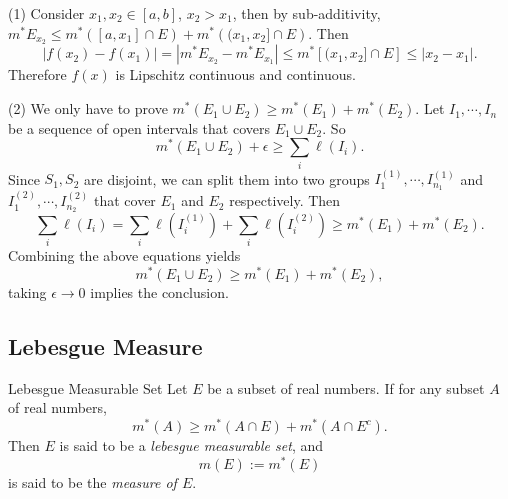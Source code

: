 \begin{solution}
  (1) Consider $x_1, x_2 \in [a, b]$, $x_2 > x_1$, then by sub-additivity,
  $m^{\ast}E_{x_2} \leq m^{\ast}\left( [a, x_1] \cap E \right) + m^{\ast} \left( (x_1, x_2] \cap E \right)$.
  Then
  \begin{equation}
    |f(x_2) - f(x_1)| = |m^{\ast}E_{x_2} - m^{\ast}E_{x_1}|
    \leq m^{\ast} \left[ (x_1, x_2] \cap E \right] \leq |x_2-x_1|.
  \end{equation}
  Therefore $f(x)$ is Lipschitz continuous and continuous.

  (2) We only have to prove $m^{\ast}(E_1 \cup E_2) \geq m^{\ast}(E_1) + m^{\ast}(E_2)$.
  Let $I_1,\cdots,I_n$ be a sequence of open intervals that covers $E_1 \cup E_2$.
  So
  \begin{equation}
    m^{\ast}(E_1 \cup E_2) + \epsilon \geq \sum_i \ell(I_i).
  \end{equation}
  Since $S_1, S_2$ are disjoint,
  we can split them into two groups $I_1^{(1)},\cdots,I_{n_1}^{(1)}$ and $I_1^{(2)},\cdots,I_{n_2}^{(2)}$
  that cover $E_1$ and $E_2$ respectively. Then
  \begin{equation}
    \sum_i \ell(I_i) = \sum_i \ell(I_i^{(1)}) + \sum_i \ell(I_i^{(2)})
    \geq m^{\ast}(E_1) + m^{\ast}(E_2).
  \end{equation}
  Combining the above equations yields
  \begin{equation}
    m^{\ast}(E_1 \cup E_2) \geq m^{\ast}(E_1) + m^{\ast}(E_2),
  \end{equation}
  taking $\epsilon \rightarrow 0$ implies the conclusion.
\end{solution}

\subsection{Lebesgue Measure}

\begin{definition}{Lebesgue Measurable Set}{}
  Let $E$ be a subset of real numbers.
  If for any subset $A$ of real numbers,
  \begin{equation}
    m^{\ast}(A) \geq m^{\ast}(A \cap E) + m^{\ast}(A \cap E^c).
  \end{equation}
  Then $E$ is said to be a \emph{lebesgue measurable set},
  and
  \begin{equation}
    m(E) := m^{\ast}(E)
  \end{equation}
  is said to be the \emph{measure of $E$}.
\end{definition}

